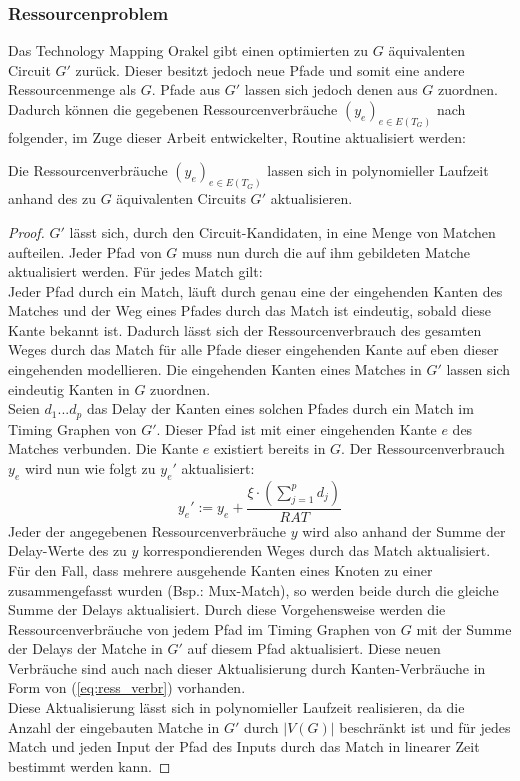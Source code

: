 \documentclass[11pt, a4paper, german]{article}
\newcommand{\TM}{Technology  Mapping }
\begin{document}
\subsubsection{Ressourcenproblem}
Das \TM Orakel  gibt einen optimierten zu $G$ äquivalenten Circuit $G'$ zurück. Dieser besitzt jedoch neue Pfade und somit eine andere Ressourcenmenge als $G$. 
Pfade aus $G'$ lassen sich jedoch denen aus $G$ zuordnen. Dadurch können die gegebenen Ressourcenverbräuche $(y_e)_{e \in E(T_G)}$ nach folgender, im Zuge dieser Arbeit entwickelter, Routine aktualisiert werden:
\begin{lemma}
Die Ressourcenverbräuche $(y_e)_{e \in E(T_G)}$ lassen sich in polynomieller Laufzeit anhand des zu $G$ äquivalenten Circuits $G'$ aktualisieren.
\end{lemma}
\begin{proof}
$G'$ lässt sich, durch den Circuit-Kandidaten, in eine Menge von Matchen aufteilen. Jeder Pfad von $G$ muss nun durch die auf ihm gebildeten Matche aktualisiert werden. Für jedes Match gilt: \\
Jeder Pfad durch ein Match, läuft durch genau eine der eingehenden Kanten des Matches  und der Weg eines Pfades durch das Match ist eindeutig, sobald diese Kante bekannt ist. Dadurch lässt sich der Ressourcenverbrauch des gesamten Weges durch das Match für alle Pfade dieser eingehenden Kante auf eben dieser eingehenden  modellieren. Die eingehenden Kanten eines Matches in $G'$ lassen sich eindeutig Kanten in $G$ zuordnen. \\
Seien $d_1 ...d_p$ das Delay der Kanten eines solchen Pfades durch ein Match im Timing Graphen von $G'$.  Dieser Pfad ist mit einer eingehenden Kante $e$ des Matches verbunden. Die Kante $e$ existiert bereits in $G$. Der Ressourcenverbrauch $y_e$ wird nun wie folgt zu $y_e'$ aktualisiert: 
\[y_e' := y_e + \frac{\xi \cdot(\sum_{j=1}^p d_j)}{RAT}\]
Jeder der angegebenen Ressourcenverbräuche $y$ wird also anhand der Summe der Delay-Werte des zu  $y$ korrespondierenden Weges durch das Match aktualisiert. 
Für den Fall, dass mehrere ausgehende Kanten eines Knoten zu einer zusammengefasst wurden (Bsp.: Mux-Match), so werden beide durch die gleiche Summe der Delays aktualisiert.
Durch diese Vorgehensweise werden die Ressourcenverbräuche von jedem Pfad im Timing Graphen von $G$ mit der Summe der Delays der Matche in $G'$ auf diesem Pfad aktualisiert. Diese neuen Verbräuche sind auch nach dieser Aktualisierung durch Kanten-Verbräuche in Form von (\ref{eq:ress_verbr}) vorhanden. \\
Diese Aktualisierung lässt sich in polynomieller Laufzeit realisieren, da die Anzahl der eingebauten Matche in $G'$ durch $|V(G)|$ beschränkt ist und für jedes Match und jeden Input der Pfad des Inputs durch das Match in linearer Zeit bestimmt werden kann. 
\end{proof}
\end{document}
